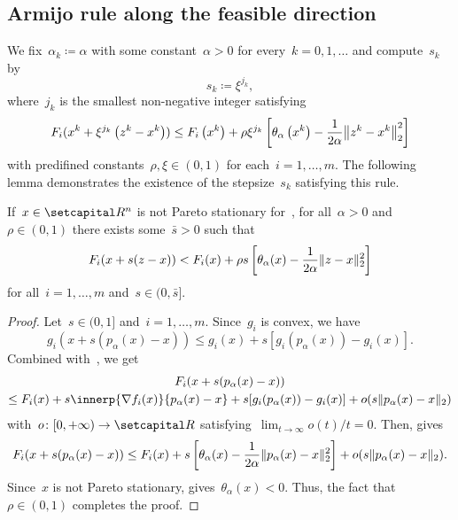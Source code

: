 \documentclass[../main]{subfiles}
\begin{document}
\subsection{Armijo rule along the feasible direction} 
We fix~$\alpha_k \coloneqq \alpha$ with some constant~$\alpha > 0$ for every~$k = 0, 1, \dots$ and compute~$s_k$ by 
\begin{equation} \label{eq:pgm_armijo_step}
    s_k \coloneqq \xi^{j_k}
,\end{equation}
where~$j_k$ is the smallest non-negative integer satisfying
\begin{equation} \label{eq:pgm_armijo_rule}
    F_i(x^k + \xi^{j_k} \left(z^k - x^k\right)) \le F_i\left(x^k\right) + \rho \xi^{j_k} \left[\theta_\alpha\left(x^k\right) - \frac{1}{2 \alpha} \norm*{z^k - x^k}_2^2\right]
\end{equation} 
with predifined constants~$\rho, \xi \in (0, 1)$ for each~$i = 1, \dots, m$.
The following lemma demonstrates the existence of the stepsize~$s_k$ satisfying this rule.
\begin{lemma} 
    If~$x \in \setR^n$ is not Pareto stationary for~, for all~$\alpha > 0$ and~$\rho \in (0, 1)$ there exists some~$\bar{s} > 0$ such that
    \begin{equation}
        F_i(x + s (z - x)) < F_i(x) + \rho s \left[\theta_\alpha(x) - \frac{1}{2 \alpha} \lVert z - x\rVert_2^2\right]
    \end{equation} 
    for all~$i = 1, \dots, m$ and~$s \in (0, \bar{s}]$.
\end{lemma}
\begin{proof}
    Let~$s \in (0, 1]$ and~$i = 1, \dots, m$.
    Since~$g_i$ is convex, we have
    \begin{equation}
        g_i(x + s (p_\alpha(x) - x)) \le g_i(x) + s [g_i(p_\alpha(x)) - g_i(x)]
    .\end{equation}
    Combined with~, we get
    \begin{multline}
        F_i(x + s (p_\alpha(x) - x)) \\
        \le F_i(x) + s \innerp{\nabla f_i(x)}{p_\alpha(x) - x} + s [g_i(p_\alpha(x)) - g_i(x)] + o(s \norm{p_\alpha(x) - x}_2)
    \end{multline}
    with~$o \colon [0, + \infty) \to \setR$ satisfying~$\lim_{t \to \infty} o(t) / t = 0$.
    Then,  gives
    \begin{equation}
        F_i(x + s (p_\alpha(x) - x)) 
        \le F_i(x) + s \left[ \theta_\alpha(x) - \frac{1}{2 \alpha} \lVert p_\alpha(x) - x\rVert_2^2 \right] + o(s \lVert p_\alpha(x) - x\rVert_2)
    .\end{equation}
    Since~$x$ is not Pareto stationary,  gives~$\theta_\alpha(x) < 0$.
    Thus, the fact that~$\rho \in (0, 1)$ completes the proof.
\end{proof}
\end{document}
